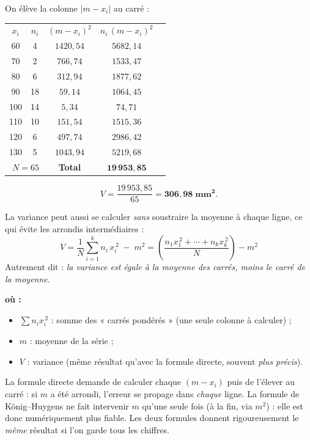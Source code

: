 \documentclass[11pt,a4paper]{article}
\newenvironment{ou}{%
  \par\smallskip\noindent\textbf{où :}\nopagebreak
  \begin{itemize}[leftmargin=1.8em,topsep=2pt,itemsep=1.5pt,parsep=0pt]}%
  {\end{itemize}}
\begin{document}
\begin{exemple}
On élève la colonne $|m-x_i|$ au carré :
\begin{center}
\renewcommand{\arraystretch}{1.15}
\begin{tabular}{c c c c c}
\rowcolor{primary!18}
$x_i$ & $n_i$ & $(m-x_i)^2$ & $n_i\,(m-x_i)^2$ \\
60  & 4  & $1420{,}54$ & $5682{,}14$ \\
70  & 2  & $766{,}74$  & $1533{,}47$ \\
80  & 6  & $312{,}94$  & $1877{,}62$ \\
90  & 18 & $59{,}14$   & $1064{,}45$ \\
100 & 14 & $5{,}34$    & $74{,}71$ \\
110 & 10 & $151{,}54$  & $1515{,}36$ \\
120 & 6  & $497{,}74$  & $2986{,}42$ \\
130 & 5  & $1043{,}94$ & $5219{,}68$ \\
\hline
\multicolumn{2}{r}{$N=65$} & \textbf{Total} & $\mathbf{19\,953{,}85}$ \\
\end{tabular}
\end{center}
\[
V=\dfrac{19\,953{,}85}{65}=\mathbf{306{,}98\;\text{mm}^2}.
\]
\end{exemple}

\begin{theoreme}
La variance peut aussi se calculer \emph{sans} soustraire la moyenne à chaque ligne, ce qui évite
les arrondis intermédiaires :
\[
\boxed{\;V=\dfrac{1}{N}\sum_{i=1}^{k} n_i\,x_i^{\,2}\;-\;m^{2}
      =\left(\dfrac{n_1 x_1^{\,2}+\cdots+n_k x_k^{\,2}}{N}\right)-m^{2}\;}
\]
Autrement dit : \emph{la variance est égale à la moyenne des carrés, moins le carré de la moyenne}.
\begin{ou}
  \item $\sum n_i x_i^{\,2}$ : somme des « carrés pondérés » (une seule colonne à calculer) ;
  \item $m$ : moyenne de la série ;
  \item $V$ : variance (même résultat qu'avec la formule directe, souvent \emph{plus précis}).
\end{ou}
\end{theoreme}

\begin{remarque}
La formule directe demande de calculer chaque $(m-x_i)$ puis de l'élever au carré : si $m$ a été
arrondi, l'erreur se propage dans \emph{chaque} ligne. La formule de König--Huygens ne fait
intervenir $m$ qu'une seule fois (à la fin, via $m^2$) : elle est donc numériquement plus fiable.
Les deux formules donnent rigoureusement le \emph{même} résultat si l'on garde tous les chiffres.
\end{remarque}
\end{document}
